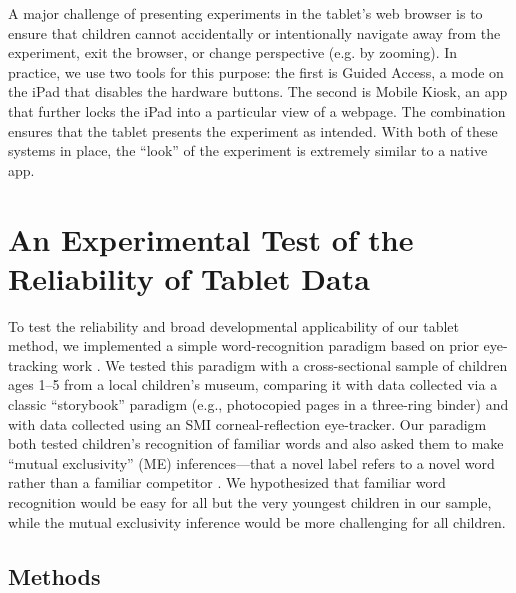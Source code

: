 \documentclass[man,noapacite]{apa2}
\begin{document}
A major challenge of presenting experiments in the tablet's web browser is to ensure that children cannot accidentally or intentionally navigate away from the experiment, exit the browser, or change perspective (e.g. by zooming). In practice, we use two tools for this purpose: the first is Guided Access, a mode on the iPad that disables the hardware buttons. The second is Mobile Kiosk, an app that further locks the iPad into a particular view of a webpage. The combination ensures that the tablet presents the experiment as intended. With both of these systems in place, the ``look'' of the experiment is extremely similar to a native app. 

\section{An Experimental Test of the Reliability of Tablet Data}
 
To test the reliability and broad developmental applicability of our tablet method, we implemented a simple word-recognition paradigm based on prior eye-tracking work \cite{fernald1998,fernald2006,bion2013}. We tested this paradigm with a cross-sectional sample of children ages 1--5 from a local children's museum, comparing it with data collected via a classic ``storybook'' paradigm (e.g., photocopied pages in a three-ring binder) and with data collected using an SMI corneal-reflection eye-tracker. Our paradigm both tested children's recognition of familiar words and also asked them to make ``mutual exclusivity'' (ME) inferences---that a novel label refers to a novel word rather than a familiar competitor \cite{markman1988}. We hypothesized that familiar word recognition would be easy for all but the very youngest children in our sample, while the mutual exclusivity inference would be more challenging for all children.

\subsection{Methods}
\end{document}
